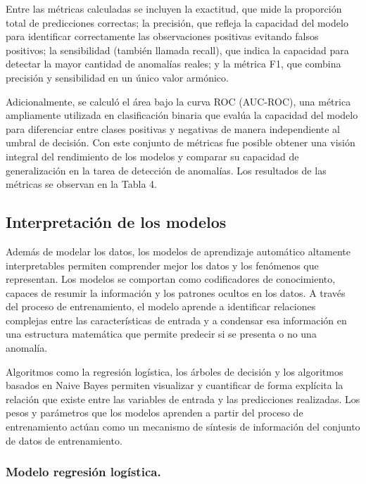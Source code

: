 \documentclass[11pt,a4paper,spanish]{book}
\numberwithin{equation}{chapter}
\numberwithin{figure}{chapter}
\begin{document}
Entre las métricas calculadas se incluyen la exactitud, que mide la proporción total de predicciones correctas; la precisión, que refleja la capacidad del modelo para identificar correctamente las observaciones positivas evitando falsos positivos; la sensibilidad (también llamada recall), que indica la capacidad para detectar la mayor cantidad de anomalías reales; y la métrica F1, que combina precisión y sensibilidad en un único valor armónico.

Adicionalmente, se calculó el área bajo la curva ROC (AUC-ROC), una métrica ampliamente utilizada en clasificación binaria que evalúa la capacidad del modelo para diferenciar entre clases positivas y negativas de manera independiente al umbral de decisión. Con este conjunto de métricas fue posible obtener una visión integral del rendimiento de los modelos y comparar su capacidad de generalización en la tarea de detección de anomalías. Los resultados de las métricas se observan en  la Tabla 4. 




\subsection{Interpretación de los modelos}


Además de modelar los datos, los modelos de aprendizaje automático altamente interpretables permiten comprender mejor los datos y los fenómenos que representan. Los modelos se comportan como codificadores de conocimiento, capaces de resumir la información y los patrones ocultos en los datos. A través del proceso de entrenamiento, el modelo aprende a identificar relaciones complejas entre las características de entrada y a condensar esa información en una estructura matemática que permite predecir si se presenta o no una anomalía. 


Algoritmos como la regresión logística, los árboles de decisión y los algoritmos basados en Naive Bayes permiten visualizar y cuantificar de forma explícita la relación que existe entre las variables de entrada y las predicciones realizadas. Los pesos y parámetros que los modelos aprenden a partir del proceso de entrenamiento actúan como un mecanismo de síntesis de información del conjunto de datos de entrenamiento. 

\subsubsection{Modelo regresión logística.}
\end{document}
